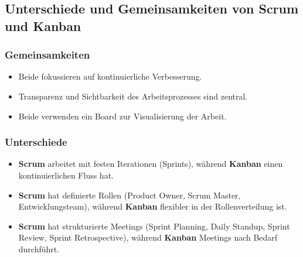 \subsection{Unterschiede und Gemeinsamkeiten von Scrum und Kanban}

\subsubsection{Gemeinsamkeiten}

\begin{itemize}
    \item Beide fokussieren auf kontinuierliche Verbesserung.
    \item Transparenz und Sichtbarkeit des Arbeitsprozesses sind zentral.
    \item Beide verwenden ein Board zur Visualisierung der Arbeit.
\end{itemize}

\subsubsection{Unterschiede}

\begin{itemize}
    \item \textbf{Scrum} arbeitet mit festen Iterationen (Sprints), während \textbf{Kanban} einen kontinuierlichen Fluss hat.
    \item \textbf{Scrum} hat definierte Rollen (Product Owner, Scrum Master, Entwicklungsteam), während \textbf{Kanban} flexibler in der Rollenverteilung ist.
    \item \textbf{Scrum} hat strukturierte Meetings (Sprint Planning, Daily Standup, Sprint Review, Sprint Retrospective), während \textbf{Kanban} Meetings nach Bedarf durchführt.
\end{itemize}